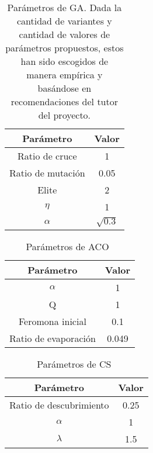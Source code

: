 \begin{table}[H]
    \centering
    \begin{tabular}{ c c }
        \hline
        \textbf{Parámetro} & \textbf{Valor} \\
        \hline
        Ratio de cruce     & 1              \\
        Ratio de mutación  & 0.05           \\
        Elite              & 2              \\
        $\eta$             & 1              \\
        $\alpha$           & $\sqrt{0.3}$   \\
        \hline
    \end{tabular}
    \caption{Parámetros de GA. Dada la cantidad de variantes y cantidad de valores de parámetros propuestos, estos han sido escogidos de manera empírica y basándose en recomendaciones del tutor del proyecto.}
\end{table}

\begin{table}[H]
    \centering
    \begin{tabular}{ c c }
        \hline
        \textbf{Parámetro}   & \textbf{Valor} \\
        \hline
        $\alpha$             & 1              \\
        Q                    & 1              \\
        Feromona inicial     & 0.1            \\
        Ratio de evaporación & 0.049          \\
        \hline
    \end{tabular}
    \caption{Parámetros de ACO~\cite{kashef_advanced_2015}}
\end{table}

\begin{table}[H]
    \centering
    \begin{tabular}{ c c }
        \hline
        \textbf{Parámetro}      & \textbf{Valor} \\
        \hline
        Ratio de descubrimiento & 0.25           \\
        $\alpha$                & 1              \\
        $\lambda$               & 1.5            \\
        \hline
    \end{tabular}
    \caption{Parámetros de CS~\cite{rodrigues_bcs_2013}}
\end{table}

